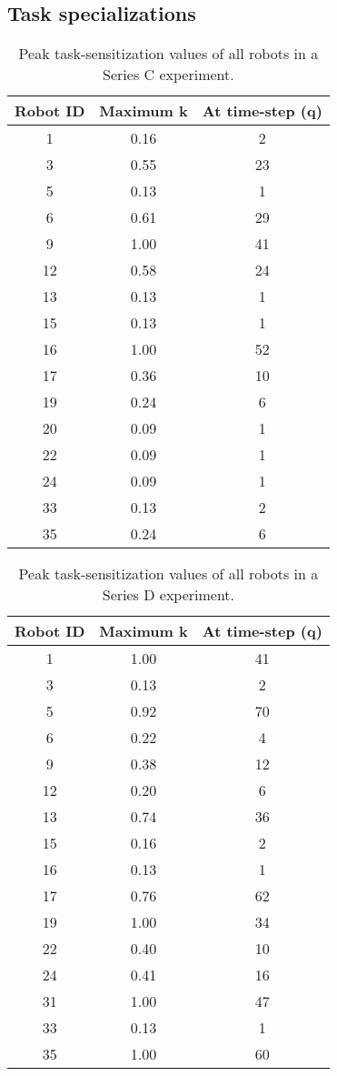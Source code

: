 \subsection*{Task specializations}
\begin{table}
\centering
\caption{Peak task-sensitization values of all robots in a Series C experiment.}
\begin{tabular}{|c|c|c|}
\hline Robot ID & Maximum k & At time-step (q) \\ 
\hline 1 & 0.16 & 2 \\ 
\hline 3 & 0.55 & 23 \\ 
\hline 5 & 0.13 & 1 \\ 
\hline 6 & 0.61 & 29 \\ 
\hline 9 & 1.00 & 41 \\ 
\hline 12 & 0.58 & 24 \\ 
\hline 13 & 0.13 & 1 \\ 
\hline 15 & 0.13 & 1 \\
\hline 16 & 1.00 & 52 \\
\hline 17 & 0.36 & 10 \\
\hline 19 & 0.24 & 6 \\ 
\hline 20 & 0.09 & 1 \\ 
\hline 22 & 0.09 & 1 \\ 
\hline 24 & 0.09 & 1 \\ 
\hline 33 & 0.13 & 2 \\ 
\hline 35 & 0.24 & 6 \\ 
\hline 
\end{tabular} 
\label{table:K-Q-SC}
\end{table}
\begin{table}
\centering
\caption{Peak task-sensitization values of all robots in a Series D experiment.}
\begin{tabular}{|c|c|c|}
\hline Robot ID & Maximum k & At time-step (q) \\ 
\hline 1 & 1.00 & 41 \\ 
\hline 3 & 0.13 & 2 \\ 
\hline 5 & 0.92 & 70 \\ 
\hline 6 & 0.22 & 4 \\ 
\hline 9 & 0.38 & 12 \\ 
\hline 12 & 0.20 & 6 \\ 
\hline 13 & 0.74 & 36 \\ 
\hline 15 & 0.16 & 2 \\
\hline 16 & 0.13 & 1 \\ 
\hline 17 & 0.76 & 62 \\ 
\hline 19 & 1.00 & 34 \\ 
\hline 22 & 0.40 & 10 \\ 
\hline 24 & 0.41 & 16 \\ 
\hline 31 & 1.00 & 47 \\ 
\hline 33 & 0.13 & 1 \\ 
\hline 35 & 1.00 & 60 \\ 
\hline 
\end{tabular}
\label{table:K-Q-SD} 
\end{table}
